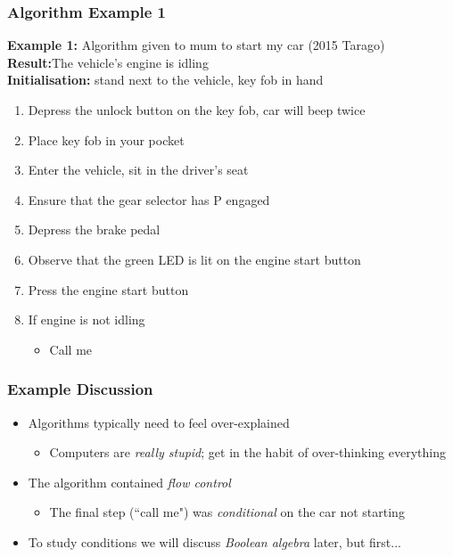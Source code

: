 \documentclass[14pt]{beamer}
\begin{document}
\begin{frame}[fragile] %

\frametitle{Algorithm Example 1}
{\footnotesize
\textbf{Example 1:} Algorithm given to mum to start my car (2015 Tarago) \\
\textbf{Result:}{The vehicle's engine is idling} \\
\textbf{Initialisation:} stand next to the vehicle, key fob in hand 
\begin{enumerate}
\setlength{\itemsep}{1pt}
  \setlength{\parskip}{0pt}
  \setlength{\parsep}{0pt}
\item Depress the unlock button on the key fob, car will beep twice
\item Place key fob in your pocket
\item Enter the vehicle, sit in the driver's seat
\item Ensure that the gear selector has P engaged
\item Depress the brake pedal
\item Observe that the green LED is lit on the engine start button
\item Press the engine start button
\item If engine is not idling
	\begin{itemize}
		\item Call me
	\end{itemize}
\end{enumerate}
}
\end{frame}

\begin{frame} %
\frametitle{Example Discussion}
\begin{itemize}
\item Algorithms typically need to feel over-explained
	\begin{itemize}
		\item Computers are \textit{really stupid}; get in the habit of over-thinking everything
	\end{itemize}
\item The algorithm contained \textit{flow control}
	\begin{itemize}
		\item The final step (``call me") was \textit{conditional} on the car not starting
	\end{itemize}
\item To study conditions we will discuss \textit{Boolean algebra} later, but first...
\end{itemize}
\end{frame}
\end{document}
